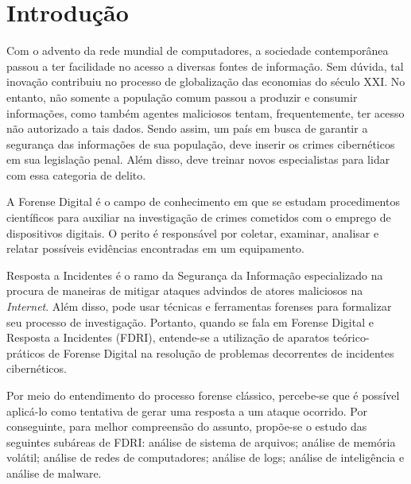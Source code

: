 \section{Introdução}

    \vspace{10.5cm}

    \hspace{1cm}
    Com o advento da rede mundial de computadores, a sociedade contemporânea passou a ter facilidade no acesso a diversas fontes de informação. Sem dúvida, tal inovação contribuiu no processo de globalização das economias do século XXI. No entanto, não somente a população comum passou a produzir e consumir informações, como também agentes maliciosos tentam, frequentemente, ter acesso não autorizado a tais dados. Sendo assim, um país em busca de garantir a segurança das informações de sua população, deve inserir os crimes cibernéticos em sua legislação penal. Além disso, deve treinar novos especialistas para lidar com essa categoria de delito.
        
    \vspace{4mm}
    
    \hspace{1cm}
    A Forense Digital é o campo de conhecimento em que se estudam procedimentos científicos para auxiliar na investigação de crimes cometidos com o emprego de dispositivos digitais. O perito é responsável por coletar, examinar, analisar e relatar possíveis evidências encontradas em um equipamento.
    
    \vspace{4mm}
	
	\hspace{1cm}
	Resposta a Incidentes é o ramo da Segurança da Informação especializado na procura de maneiras de mitigar ataques advindos de atores maliciosos na \textit{Internet}. Além disso, pode usar técnicas e ferramentas forenses para formalizar seu processo de investigação. Portanto, quando se fala em Forense Digital e Resposta a Incidentes (FDRI), entende-se a utilização de aparatos teórico-práticos de Forense Digital na resolução de problemas decorrentes de incidentes cibernéticos.
    
    \vspace{4mm}
	
	\hspace{1cm}
	Por meio do entendimento do processo forense clássico, percebe-se que é possível aplicá-lo como tentativa de gerar uma resposta a um ataque ocorrido. Por conseguinte, para melhor compreensão do assunto, propõe-se o estudo das seguintes subáreas de FDRI: análise de sistema de arquivos; análise de memória volátil; análise de redes de computadores; análise de logs; análise de inteligência e análise de malware.
    
